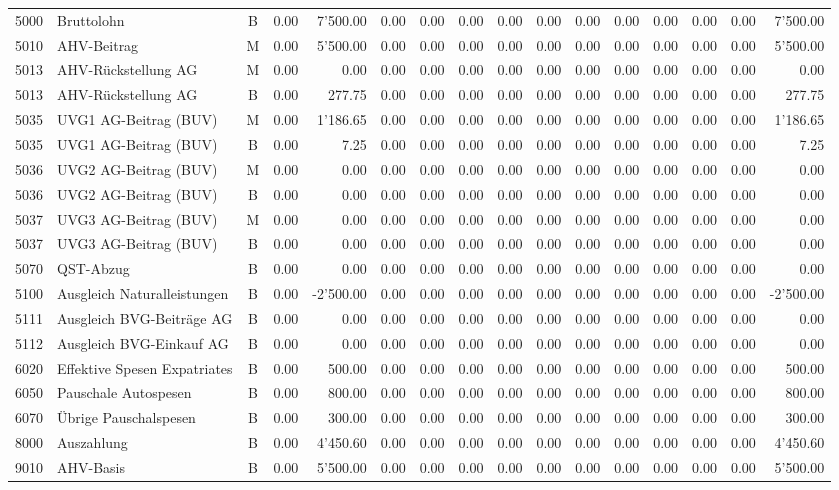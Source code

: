 \documentclass[8pt,a4paper]{extarticle}
\begin{document}
\begin{longtable}{@{\extracolsep{\fill}} l l c r r r r r r r r r r r r r}
5000&Bruttolohn&B&0.00&7'500.00&0.00&0.00&0.00&0.00&0.00&0.00&0.00&0.00&0.00&0.00&7'500.00\\
5010&AHV-Beitrag&M&0.00&5'500.00&0.00&0.00&0.00&0.00&0.00&0.00&0.00&0.00&0.00&0.00&5'500.00\\
5013&AHV-Rückstellung AG&M&0.00&0.00&0.00&0.00&0.00&0.00&0.00&0.00&0.00&0.00&0.00&0.00&0.00\\
5013&AHV-Rückstellung AG&B&0.00&277.75&0.00&0.00&0.00&0.00&0.00&0.00&0.00&0.00&0.00&0.00&277.75\\
5035&UVG1 AG-Beitrag (BUV)&M&0.00&1'186.65&0.00&0.00&0.00&0.00&0.00&0.00&0.00&0.00&0.00&0.00&1'186.65\\
5035&UVG1 AG-Beitrag (BUV)&B&0.00&7.25&0.00&0.00&0.00&0.00&0.00&0.00&0.00&0.00&0.00&0.00&7.25\\
5036&UVG2 AG-Beitrag (BUV)&M&0.00&0.00&0.00&0.00&0.00&0.00&0.00&0.00&0.00&0.00&0.00&0.00&0.00\\
5036&UVG2 AG-Beitrag (BUV)&B&0.00&0.00&0.00&0.00&0.00&0.00&0.00&0.00&0.00&0.00&0.00&0.00&0.00\\
5037&UVG3 AG-Beitrag (BUV)&M&0.00&0.00&0.00&0.00&0.00&0.00&0.00&0.00&0.00&0.00&0.00&0.00&0.00\\
5037&UVG3 AG-Beitrag (BUV)&B&0.00&0.00&0.00&0.00&0.00&0.00&0.00&0.00&0.00&0.00&0.00&0.00&0.00\\
5070&QST-Abzug&B&0.00&0.00&0.00&0.00&0.00&0.00&0.00&0.00&0.00&0.00&0.00&0.00&0.00\\
5100&Ausgleich Naturalleistungen&B&0.00&-2'500.00&0.00&0.00&0.00&0.00&0.00&0.00&0.00&0.00&0.00&0.00&-2'500.00\\
5111&Ausgleich BVG-Beiträge AG&B&0.00&0.00&0.00&0.00&0.00&0.00&0.00&0.00&0.00&0.00&0.00&0.00&0.00\\
5112&Ausgleich BVG-Einkauf AG&B&0.00&0.00&0.00&0.00&0.00&0.00&0.00&0.00&0.00&0.00&0.00&0.00&0.00\\
6020&Effektive Spesen Expatriates&B&0.00&500.00&0.00&0.00&0.00&0.00&0.00&0.00&0.00&0.00&0.00&0.00&500.00\\
6050&Pauschale Autospesen&B&0.00&800.00&0.00&0.00&0.00&0.00&0.00&0.00&0.00&0.00&0.00&0.00&800.00\\
6070&Übrige Pauschalspesen&B&0.00&300.00&0.00&0.00&0.00&0.00&0.00&0.00&0.00&0.00&0.00&0.00&300.00\\
8000&Auszahlung&B&0.00&4'450.60&0.00&0.00&0.00&0.00&0.00&0.00&0.00&0.00&0.00&0.00&4'450.60\\
9010&AHV-Basis&B&0.00&5'500.00&0.00&0.00&0.00&0.00&0.00&0.00&0.00&0.00&0.00&0.00&5'500.00\\

\end{longtable}
\end{document}

